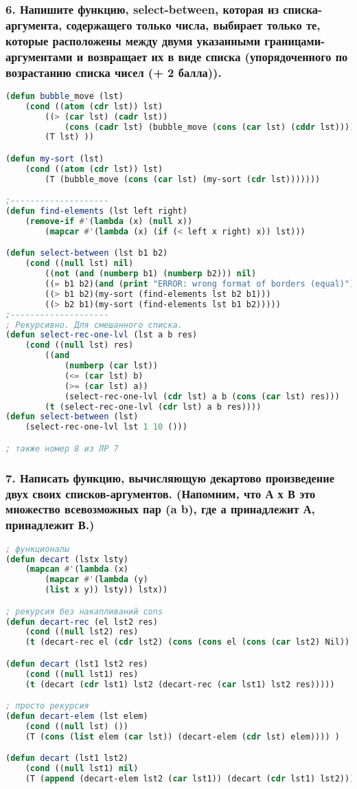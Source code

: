 \newpage
\subsubsection*{6. Напишите функцию, select-between, которая из списка-аргумента, содержащего только числа, выбирает только те, которые расположены между двумя указанными границами-аргументами и возвращает их в виде списка (упорядоченного по возрастанию списка чисел (+ 2 балла)).}
\begin{lstlisting}[language=Lisp]
(defun bubble_move (lst)
	(cond ((atom (cdr lst)) lst)
		((> (car lst) (cadr lst)) 
			(cons (cadr lst) (bubble_move (cons (car lst) (cddr lst)))))
		(T lst) ))

(defun my-sort (lst)
	(cond ((atom (cdr lst)) lst)
		(T (bubble_move (cons (car lst) (my-sort (cdr lst)))))))

;--------------------
(defun find-elements (lst left right)
	(remove-if #'(lambda (x) (null x))
		(mapcar #'(lambda (x) (if (< left x right) x)) lst)))

(defun select-between (lst b1 b2)
	(cond ((null lst) nil)
		((not (and (numberp b1) (numberp b2))) nil)
		((= b1 b2)(and (print "ERROR: wrong format of borders (equal)") nil))
		((> b1 b2)(my-sort (find-elements lst b2 b1)))
		((> b2 b1)(my-sort (find-elements lst b1 b2)))))
;--------------------
; Рекурсивно. Для смешанного списка.
(defun select-rec-one-lvl (lst a b res)
	(cond ((null lst) res)
		((and 
			(numberp (car lst)) 
			(<= (car lst) b) 
			(>= (car lst) a)) 
			(select-rec-one-lvl (cdr lst) a b (cons (car lst) res)))
		(t (select-rec-one-lvl (cdr lst) a b res))))
(defun select-between (lst)
	(select-rec-one-lvl lst 1 10 ()))

; также номер 8 из ЛР 7
\end{lstlisting}

\newpage
\subsubsection*{7. Написать функцию, вычисляющую декартово произведение двух своих списков-аргументов. (Напомним, что А х В это множество всевозможных пар (a b), где а принадлежит А, принадлежит В.)}
\begin{lstlisting}[language=Lisp]
; функционалы
(defun decart (lstx lsty)
	(mapcan #'(lambda (x)
		(mapcar #'(lambda (y)
		(list x y)) lsty)) lstx))

; рекурсия без накапливаний cons
(defun decart-rec (el lst2 res)
	(cond ((null lst2) res)
	(t (decart-rec el (cdr lst2) (cons (cons el (cons (car lst2) Nil)) res) ))))

(defun decart (lst1 lst2 res)
	(cond ((null lst1) res)
	(t (decart (cdr lst1) lst2 (decart-rec (car lst1) lst2 res)))))

; просто рекурсия 
(defun decart-elem (lst elem)
	(cond ((null lst) ())
	(T (cons (list elem (car lst)) (decart-elem (cdr lst) elem)))) )

(defun decart (lst1 lst2)
	(cond ((null lst1) nil)
	(T (append (decart-elem lst2 (car lst1)) (decart (cdr lst1) lst2)))) )

\end{lstlisting}

